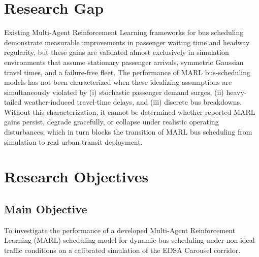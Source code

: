 \section{Research Gap}
Existing Multi-Agent Reinforcement Learning frameworks for bus scheduling demonstrate measurable improvements in passenger waiting time and headway regularity, but these gains are validated almost exclusively in simulation environments that assume stationary passenger arrivals, symmetric Gaussian travel times, and a failure-free fleet. The performance of MARL bus-scheduling models has not been characterized when these idealizing assumptions are simultaneously violated by (i) stochastic passenger demand surges, (ii) heavy-tailed weather-induced travel-time delays, and (iii) discrete bus breakdowns. Without this characterization, it cannot be determined whether reported MARL gains persist, degrade gracefully, or collapse under realistic operating disturbances, which in turn blocks the transition of MARL bus scheduling from simulation to real urban transit deployment.



\section{Research Objectives}
\subsection{Main Objective}
To investigate the performance of a developed Multi-Agent Reinforcement Learning (MARL) scheduling model for dynamic bus scheduling under non-ideal traffic conditions on a calibrated simulation of the EDSA Carousel corridor.

